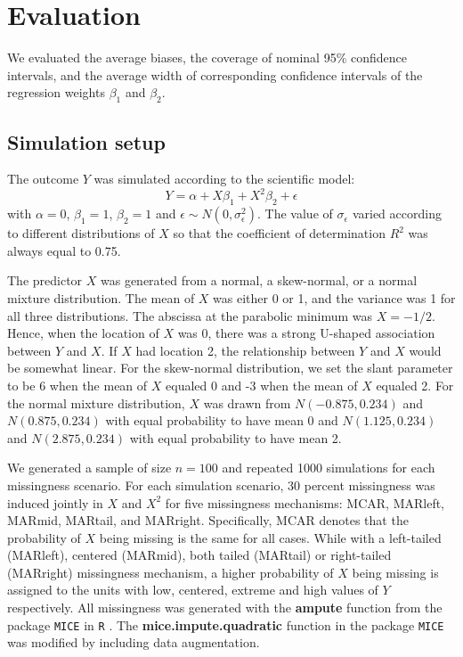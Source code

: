 	\section{Evaluation}
	We evaluated the average biases, the coverage of nominal 95\% confidence intervals, and the average width of corresponding confidence intervals of the regression weights $\beta_{1}$ and $\beta_{2}$. 
	\subsection{Simulation setup}
	The outcome $Y$ was simulated according to the scientific model:
	\begin{equation}
		Y = \alpha + X\beta_{1} + X^2\beta_{2} +\epsilon
	\end{equation}
	with $\alpha = 0$, $\beta_{1} = 1$, $\beta_{2} = 1$ and  $\epsilon \sim N(0, \sigma_{\epsilon}^2)$. The value of $\sigma_{\epsilon}$ varied according to different distributions of $X$ so that the coefficient of determination $R^2$ was always equal to 0.75. 
	
	The predictor $X$ was generated from a normal, a skew-normal, or a normal mixture distribution. The mean of $X$ was either 0 or 1, and the variance was 1 for all three distributions. The abscissa at the parabolic minimum was $X = -1/2$. Hence, when the location of $X$ was 0, there was a strong U-shaped association between $Y$ and $X$. If $X$ had location 2, the relationship between $Y$ and $X$ would be somewhat linear. For the skew-normal distribution, we set the slant parameter to be 6 when the mean of $X$ equaled 0 and -3 when the mean of $X$ equaled 2. For the normal mixture distribution, $X$ was drawn from $N(-0.875, 0.234)$ and $N(0.875, 0.234)$ with equal probability to have mean 0 and $N(1.125, 0.234)$ and $N(2.875, 0.234)$ with equal probability to have mean 2. 
	
	We generated a sample of size $n = 100$ and repeated 1000 simulations for each missingness scenario. For each simulation scenario, 30 percent missingness was induced jointly in $X$ and $X^2$ for five missingness mechanisms: MCAR, MARleft, MARmid, MARtail, and MARright. Specifically, MCAR denotes that the probability of $X$ being missing is the same for all cases. While with a left-tailed (MARleft), centered (MARmid), both tailed (MARtail) or right-tailed (MARright) missingness mechanism, a higher probability of $X$ being missing is assigned to the units with low, centered, extreme and high values of $Y$ respectively. All missingness was generated with the \textbf{ampute} function \citep{Schouten2018} from the package \texttt{MICE} \citep{Buuren2011} in \texttt{R} \citep{R2018}. The \textbf{mice.impute.quadratic} function in the package \texttt{MICE} was modified by including data augmentation.
